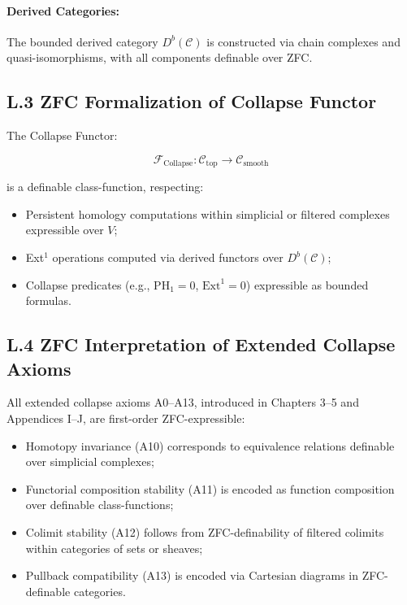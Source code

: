 \documentclass[11pt]{article}
\begin{document}
\paragraph{Derived Categories:}  
The bounded derived category \( D^b(\mathcal{C}) \) is constructed via chain complexes and quasi-isomorphisms, with all components definable over ZFC.

\subsection*{L.3 ZFC Formalization of Collapse Functor}

The Collapse Functor:

\[
\mathcal{F}_{\mathrm{Collapse}} : \mathcal{C}_{\mathrm{top}} \to \mathcal{C}_{\mathrm{smooth}}
\]

is a definable class-function, respecting:

\begin{itemize}
    \item Persistent homology computations within simplicial or filtered complexes expressible over \( V \);
    \item Ext$^1$ operations computed via derived functors over \( D^b(\mathcal{C}) \);
    \item Collapse predicates (e.g., \( \mathrm{PH}_1 = 0 \), \( \mathrm{Ext}^1 = 0 \)) expressible as bounded formulas.
\end{itemize}

\subsection*{L.4 ZFC Interpretation of Extended Collapse Axioms}

All extended collapse axioms A0–A13, introduced in Chapters 3–5 and Appendices I–J, are first-order ZFC-expressible:

\begin{itemize}
    \item Homotopy invariance (A10) corresponds to equivalence relations definable over simplicial complexes;
    \item Functorial composition stability (A11) is encoded as function composition over definable class-functions;
    \item Colimit stability (A12) follows from ZFC-definability of filtered colimits within categories of sets or sheaves;
    \item Pullback compatibility (A13) is encoded via Cartesian diagrams in ZFC-definable categories.
\end{itemize}
\end{document}
